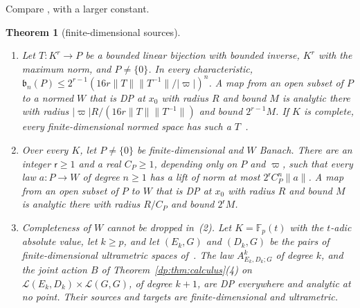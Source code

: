 \documentclass[11pt]{amsart}
\newtheorem{theorem}{Theorem}[section]
\theoremstyle{definition}
\theoremstyle{remark}
\numberwithin{equation}{section}
\newcommand{\F}{\mathbb F}
\newcommand{\cL}{\mathcal L}
\newcommand{\abs}[1]{\lvert #1\rvert}
\newcommand{\norm}[1]{\lVert #1\rVert}
\theoremstyle{plain}
\theoremstyle{definition}
\theoremstyle{plain}
\begin{document}
Compare \cite[Theorem~14.39(3) and Proposition~14.40(2)]{I}, with a larger constant.

\begin{theorem}[finite-dimensional sources]\label{dp:thm:agreement-finite}
\leavevmode
\begin{enumerate}
\item Let $T\colon K^r\to P$ be a bounded linear bijection with bounded inverse, $K^r$ with the maximum norm, and $P\ne\{0\}$. In every characteristic, $\mathfrak b_n(P)\le2^{r-1}(16r\norm T\norm{T^{-1}}/\abs\varpi)^n$. A map from an open subset of $P$ to a normed $W$ that is DP at $x_0$ with radius $R$ and bound $M$ is analytic there with radius $\abs\varpi R/(16r\norm T\norm{T^{-1}})$ and bound $2^{r-1}M$. If $K$ is complete, every finite-dimensional normed space has such a $T$~\cite[Lemma~A.3]{I}.
\item Over every $K$, let $P\ne\{0\}$ be finite-dimensional and $W$ Banach. There are an integer $\mathsf r\ge1$ and a real $C_P\ge1$, depending only on $P$ and $\varpi$, such that every law $a\colon P\to W$ of degree $n\ge1$ has a lift of norm at most $2^{\mathsf r}C_P^n\norm a$. A map from an open subset of $P$ to $W$ that is DP at $x_0$ with radius $R$ and bound $M$ is analytic there with radius $R/C_P$ and bound $2^{\mathsf r}M$.
\item Completeness of $W$ cannot be dropped in~\textup{(2)}. Let $K=\F_p(t)$ with the $t$-adic absolute value, let $k\ge p$, and let $(E_k,G)$ and $(D_k,G)$ be the pairs of finite-dimensional ultrametric spaces of~\cite[Theorem~H.4]{I}. The law $A^k_{E_k,D_k;G}$ of degree $k$, and the joint action $B$ of Theorem~\ref{dp:thm:calculus}(4) on $\cL(E_k,D_k)\times\cL(G,G)$, of degree $k+1$, are DP everywhere and analytic at no point. Their sources and targets are finite-dimensional and ultrametric.
\end{enumerate}
\end{theorem}
\end{document}
